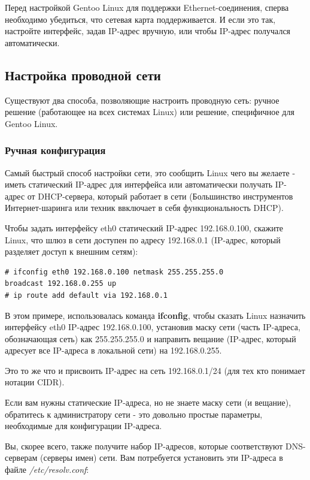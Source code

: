 \documentclass[10pt]{book}
\begin{document}
Перед настройкой Gentoo Linux для поддержки Ethernet-соединения, сперва необходимо убедиться, что сетевая карта поддерживается. И если это так, настройте интерфейс,  задав IP-адрес вручную, или чтобы IP-адрес получался автоматически.

\subsection{Настройка проводной сети}
Существуют два способа, позволяющие настроить проводную сеть: ручное решение (работающее на всех системах Linux) или решение, специфичное для Gentoo Linux.

\subsubsection{Ручная конфигурация}
Самый быстрый способ настройки сети, это сообщить Linux чего вы желаете - иметь статический IP-адрес для интерфейса или автоматически получать IP-адрес от DHCP-сервера, который работает в сети (Большинство инструментов Интернет-шаринга или техник ввключает в себя функциональность DHCP).

Чтобы задать интерфейсу eth0 статический IP-адрес 192.168.0.100, скажите Linux, что шлюз в сети доступен по адресу 192.168.0.1 (IP-адрес, который разделяет доступ к внешним сетям):

\begin{tcolorbox}
\begin{lstlisting}
# ifconfig eth0 192.168.0.100 netmask 255.255.255.0
broadcast 192.168.0.255 up
# ip route add default via 192.168.0.1
\end{lstlisting}
\end{tcolorbox}

В этом примере, использовалась команда \textbf{ifconfig}, чтобы сказать Linux назначить интерфейсу eth0 IP-адрес 192.168.0.100, установив маску сети (часть IP-адреса, обозначающая сеть) как 255.255.255.0 и направить вещание (IP-адрес, который адресует все IP-адреса в локальной сети) на 192.168.0.255.

Это то же что и присвоить IP-адрес на сеть 192.168.0.1/24 (для тех кто понимает
нотации CIDR).

Если вам нужны статические IP-адреса, но не знаете маску сети (и вещание), обратитесь к администратору сети - это довольно простые параметры, необходимые для конфигурации IP-адреса.

Вы, скорее всего, также получите набор IP-адресов, которые соответствуют DNS-серверам (серверы имен) сети. Вам потребуется установить эти IP-адреса в файле \textit{/etc/resolv.conf}:
\end{document}

